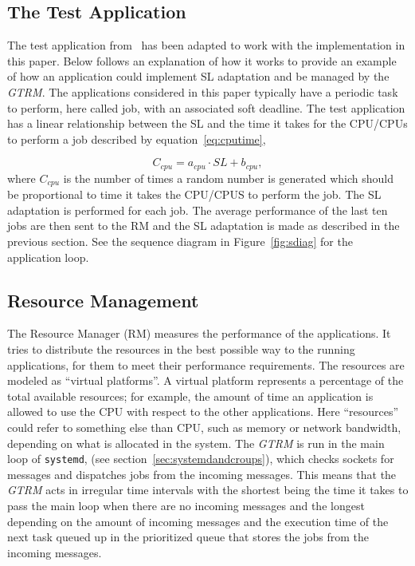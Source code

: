 \documentclass[nobiblatex]{LTHthesis}
\begin{document}
\subsection{The Test Application}
The test application from~\cite{gtrm} has been adapted to work with the implementation in this paper. Below follows an explanation of how it works to provide an example of how an application could implement SL adaptation and be managed by the \emph{GTRM}.
The applications considered in this paper typically have a periodic task to perform, here called job, with an associated soft deadline.
The test application has a linear relationship between the SL and the time it takes for the CPU/CPUs to perform a job described by equation~\ref{eq:cputime},

\begin{equation}
C_{cpu} = a_{cpu} \cdot SL + b_{cpu},
\label{eq:cputime}
\end{equation} 
where $C_{cpu}$ is the number of times a random number is generated which
should be proportional to time it takes the CPU/CPUS to perform the job.
The SL adaptation is  performed for each job. The average performance of the
last ten jobs are then sent to the RM and the SL adaptation is made as
described in the previous section. See the sequence diagram in 
Figure~\ref{fig:sdiag} for the application loop.

\subsection{Resource Management}

The Resource Manager (RM) measures the performance of the applications. It
tries to distribute the resources in the best possible way to the running
applications, for them to meet their performance requirements. The resources
are modeled as ``virtual platforms''. A virtual platform represents a
percentage of the total available resources; for example, the amount of time
an application is allowed to use the CPU with respect to the other 
applications. Here ``resources'' could refer to something else than CPU,
such as memory or network bandwidth, depending on what is allocated in the
system. The \emph{GTRM} is run in the main loop of \texttt{systemd}, (see section~\ref{sec:systemdandcroups}), which checks sockets for messages and dispatches jobs from the incoming messages. This means that the 
\emph{GTRM} acts in irregular time intervals with the shortest being the time it 
takes to pass the main loop when there are no incoming messages and the 
longest depending on the amount of incoming messages and the execution time of 
the next task queued up in the prioritized queue that stores the jobs from the 
incoming messages. 
\end{document}
